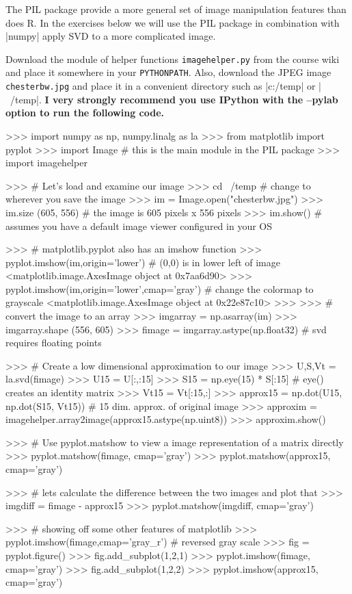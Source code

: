 \documentclass[11pt,letterpaper]{article}
\begin{document}
The PIL package provide a more general set of image manipulation features than does R.  In the exercises below we will use the PIL package in combination with |numpy| apply SVD to a more complicated image.

Download the module of helper functions \texttt{imagehelper.py} from the course wiki and place it somewhere in your \texttt{PYTHONPATH}. Also, download the JPEG image \texttt{chesterbw.jpg} and place it in a convenient directory such as |c:/temp| or |~/temp|. {\color{red} \bfseries I very strongly recommend you use IPython with the --pylab option to run the following code.}

\begin{Pcode}
>>> import numpy as np, numpy.linalg as la
>>> from matplotlib import pyplot
>>> import Image # this is the main module in the PIL package
>>> import imagehelper

>>>  # Let's load and examine our image
>>> cd ~/temp # change to wherever you save the image
>>> im = Image.open("chesterbw.jpg")
>>> im.size
(605, 556) # the image is 605 pixels x 556 pixels
>>> im.show() # assumes you have a default image viewer configured in your OS
 
>>> # matplotlib.pyplot also has an imshow function
>>> pyplot.imshow(im,origin='lower') # (0,0) is in lower left of image
<matplotlib.image.AxesImage object at 0x7aa6d90>
>>> pyplot.imshow(im,origin='lower',cmap='gray') # change the colormap to grayscale
<matplotlib.image.AxesImage object at 0x22e87c10>
>>>
>>>   # convert the image to an array
>>> imgarray = np.asarray(im)
>>> imgarray.shape
(556, 605)
>>> fimage = imgarray.astype(np.float32) # svd requires floating points

>>>   # Create a low dimensional approximation to our image
>>> U,S,Vt = la.svd(fimage)
>>> U15 = U[:,:15]
>>> S15 = np.eye(15) * S[:15] # eye() creates an identity matrix
>>> Vt15 = Vt[:15,:]
>>> approx15 = np.dot(U15, np.dot(S15, Vt15)) # 15 dim. approx. of original image
>>> approxim = imagehelper.array2image(approx15.astype(np.uint8))
>>> approxim.show()

>>>    # Use pyplot.matshow to view a image representation of a matrix directly
>>> pyplot.matshow(fimage, cmap='gray')
>>> pyplot.matshow(approx15, cmap='gray')

>>>    # lets calculate the difference between the two images and plot that
>>> imgdiff = fimage - approx15
>>> pyplot.matshow(imgdiff, cmap='gray')

>>>    # showing off some other features of matplotlib
>>> pyplot.imshow(fimage,cmap='gray_r') # reversed gray scale
>>> fig = pyplot.figure()
>>> fig.add_subplot(1,2,1)
>>> pyplot.imshow(fimage, cmap='gray')
>>> fig.add_subplot(1,2,2)
>>> pyplot.imshow(approx15, cmap='gray')

\end{Pcode}
\end{document}
